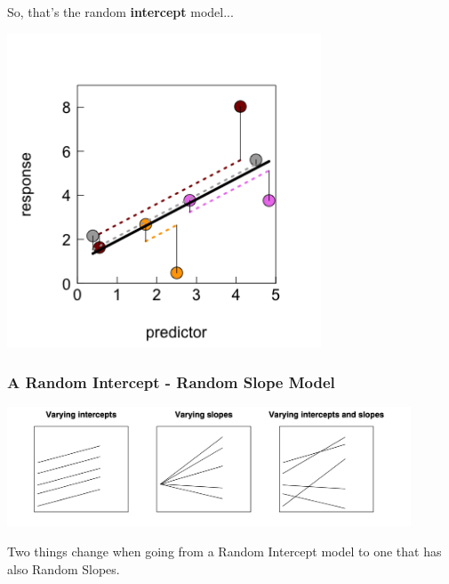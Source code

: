 \documentclass{beamer}
\begin{document}
\begin{frame}
\Large
\centering
So, that's the random \textbf{intercept} model...

\includegraphics[width=0.7\textwidth]{lectures/day_5_theory_of_mems/figures/unnamed-chunk-8-1.png}
\end{frame}

\begin{frame}
\frametitle{A Random Intercept - Random Slope Model}

\includegraphics[width=0.9\textwidth]{lectures/day_5_theory_of_mems/figures/gelman_hill.png}

\Large
Two things change when going from a Random Intercept model to one that has also Random Slopes.
\end{frame}
\end{document}
